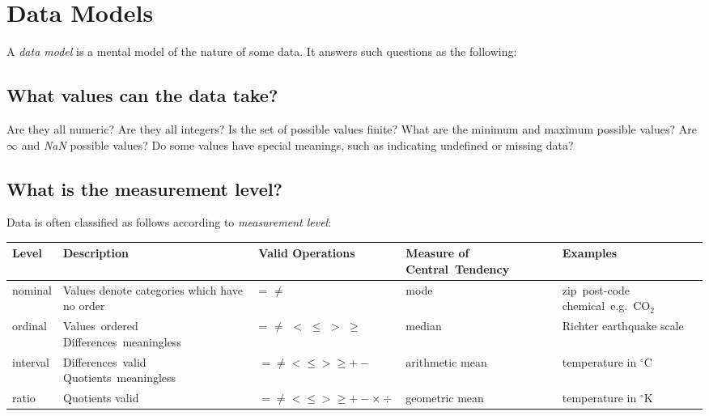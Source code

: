 
\section{Data Models}

A 
  \textit{data model} is a mental model of the nature of some data. It
  answers such questions as the following:

\subsection{What values can the data take?}

Are they all numeric? Are they
  all integers? Is the set of possible values finite? What are the
  minimum and maximum possible values? Are $\infty$ and 
  \textit{NaN} possible values? Do some values have special meanings,
  such as indicating undefined or missing data?

\subsection{What is the measurement level?}

Data is often classified as follows according to \emph{measurement level}:
\\
    \begin{tabular}{|l||p{40 mm}|p{20 mm}|p{20 mm}|p{30 mm}|}
    \hline 
      \textbf{Level} & 
      \textbf{Description} & 
      \textbf{Valid \mbox{Operations}} & 
      \textbf{Measure of Central\ Tendency} & 
      \textbf{Examples}
    \\
    \hline 
    \hline 
      nominal & 
      Values denote categories which have no order & 
      = $\neq$ & 
      mode & 
      \mbox{zip post-code} \mbox{chemical e.g. CO$_{2}$}
    \\
    \hline 
      ordinal & 
      \mbox{Values ordered} \mbox{Differences meaningless} & 
      = $\neq$ $<$ $\le$ $>$ $\ge$ & 
      median & 
      Richter earthquake scale
    \\
    \hline 
      interval & 
      \mbox{Differences valid} \mbox{Quotients meaningless} & 
      $= \neq < \le > \ge + -$ & 
      arithmetic mean & 
      temperature in $^{\circ}$C
    \\
    \hline 
      ratio & 
      Quotients valid & 
      $= \neq < \le > \ge + - \times \div $ & 
      geometric mean & 
      temperature in $^{\circ}$K 
    \\
  \hline
\end{tabular}

